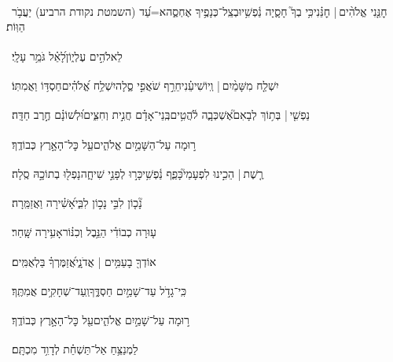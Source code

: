 \documentclass[12pt]{article}
\newcommand{\loc}[1]{\textsuperscript{\locf{#1}}}
\begin{document}
{\loc{ ב}~}‏חׇנֵּ֤נִי אֱלֹהִ֨ים |  חׇנֵּ֗נִי{\hfill}כִּ֥י בְךָ֮ חָסָ֢יָה נַ֫פְשִׁ֥י\newline\hspace*{.5em}וּבְצֵֽל־כְּנָפֶ֥יךָ אֶחְסֶ֑ה{\hfill}א=עַ֝ד (השמטת נקודת הרביע) יַעֲבֹ֥ר הַוּֽוֹת׃\par

{\loc{ ג}~}‏ לֵאלֹהִ֣ים עֶלְי֑וֹן{\hfill}לָ֝אֵ֗ל גֹּמֵ֥ר עָלָֽי׃\par

{\loc{ ד}~}‏יִשְׁלַ֤ח מִשָּׁמַ֨יִם |  וְֽיוֹשִׁיעֵ֗נִי{\hfill}חֵרֵ֣ף שֹׁאֲפִ֣י סֶ֑לָה\newline\hspace*{.5em}יִשְׁלַ֥ח אֱ֝לֹהִ֗ים{\hfill}חַסְדּ֥וֹ וַאֲמִתּֽוֹ׃\par

{\loc{ ה}~}‏נַפְשִׁ֤י |  בְּת֥וֹךְ לְבָאִם֮{\hfill}אֶשְׁכְּבָ֢ה לֹ֫הֲטִ֥ים\newline\hspace*{.5em}בְּֽנֵי־אָדָ֗ם  חֲנִ֣ית וְחִצִּ֑ים{\hfill}וּ֝לְשׁוֹנָ֗ם חֶ֣רֶב חַדָּֽה׃\par

{\loc{ ו}~}‏ר֣וּמָה עַל־הַשָּׁמַ֣יִם אֱלֹהִ֑ים{\hfill}עַ֖ל כׇּל־הָאָ֣רֶץ כְּבוֹדֶֽךָ׃\par

{\loc{ ז}~}‏רֶ֤שֶׁת |  הֵכִ֣ינוּ לִפְעָמַי֮{\hfill}כָּפַ֢ף נַ֫פְשִׁ֥י\newline\hspace*{.5em}כָּר֣וּ לְפָנַ֣י שִׁיחָ֑ה{\hfill}נָפְל֖וּ בְתוֹכָ֣הּ סֶֽלָה׃\par

{\loc{ ח}~}‏נָ֘כ֤וֹן לִבִּ֣י  נָכ֣וֹן לִבִּ֑י{\hfill}אָ֝שִׁ֗ירָה וַאֲזַמֵּֽרָה׃\par

{\loc{ ט}~}‏ע֤וּרָה כְבוֹדִ֗י{\hfill} הַנֵּ֥בֶל וְכִנּ֗וֹר\newline\hspace*{.5em}אָעִ֥ירָה שָּֽׁחַר׃\par

{\loc{ י}~}‏אוֹדְךָ֖ בָעַמִּ֥ים | אֲדֹנָ֑י{\hfill}אֲ֝זַמֶּרְךָ֗ בַּלְאֻמִּֽים׃\par

{\loc{ יא}~}‏כִּֽי־גָדֹ֣ל עַד־שָׁמַ֣יִם חַסְדֶּ֑ךָ{\hfill}וְֽעַד־שְׁחָקִ֥ים אֲמִתֶּֽךָ׃\par

{\loc{ יב}~}‏ר֣וּמָה עַל־שָׁמַ֣יִם אֱלֹהִ֑ים{\hfill}עַ֖ל כׇּל־הָאָ֣רֶץ כְּבוֹדֶֽךָ׃\par\pend
\ledpb
\pstart[\subsection*{\textcolor{red}{פרק נח}}]\label{פרק נח}
{\loc{ א}~}‏לַמְנַצֵּ֥חַ אַל־תַּשְׁחֵ֗ת לְדָוִ֥ד מִכְתָּֽם׃\par
\end{document}
